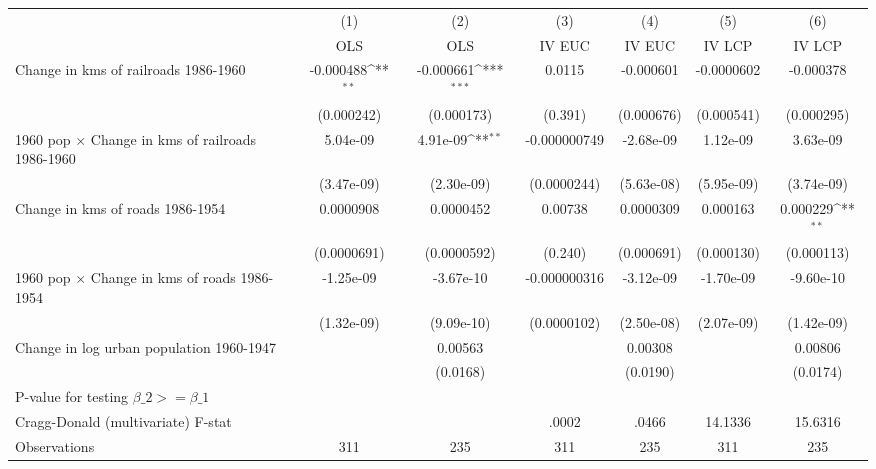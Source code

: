 {
\def\sym#1{\ifmmode^{#1}\else\(^{#1}\)\fi}
\begin{tabular}{l*{6}{c}}
\hline\hline
                &\multicolumn{1}{c}{(1)}&\multicolumn{1}{c}{(2)}&\multicolumn{1}{c}{(3)}&\multicolumn{1}{c}{(4)}&\multicolumn{1}{c}{(5)}&\multicolumn{1}{c}{(6)}\\
                &\multicolumn{1}{c}{OLS}&\multicolumn{1}{c}{OLS}&\multicolumn{1}{c}{IV EUC}&\multicolumn{1}{c}{IV EUC}&\multicolumn{1}{c}{IV LCP}&\multicolumn{1}{c}{IV LCP}\\
\hline
Change in kms of railroads 1986-1960&-0.000488\sym{**} &-0.000661\sym{***}&   0.0115         &-0.000601         &-0.0000602         &-0.000378         \\
                &(0.000242)         &(0.000173)         &  (0.391)         &(0.000676)         &(0.000541)         &(0.000295)         \\
[1em]
1960 pop $\times$ Change in kms of railroads 1986-1960& 5.04e-09         & 4.91e-09\sym{**} &-0.000000749         &-2.68e-09         & 1.12e-09         & 3.63e-09         \\
                &(3.47e-09)         &(2.30e-09)         &(0.0000244)         &(5.63e-08)         &(5.95e-09)         &(3.74e-09)         \\
[1em]
Change in kms of roads 1986-1954&0.0000908         &0.0000452         &  0.00738         &0.0000309         & 0.000163         & 0.000229\sym{**} \\
                &(0.0000691)         &(0.0000592)         &  (0.240)         &(0.000691)         &(0.000130)         &(0.000113)         \\
[1em]
1960 pop $\times$ Change in kms of roads 1986-1954&-1.25e-09         &-3.67e-10         &-0.000000316         &-3.12e-09         &-1.70e-09         &-9.60e-10         \\
                &(1.32e-09)         &(9.09e-10)         &(0.0000102)         &(2.50e-08)         &(2.07e-09)         &(1.42e-09)         \\
[1em]
Change in log urban population 1960-1947&                  &  0.00563         &                  &  0.00308         &                  &  0.00806         \\
                &                  & (0.0168)         &                  & (0.0190)         &                  & (0.0174)         \\
\hline
P-value for testing $\beta\_{2} >= \beta\_{1}$&                  &                  &                  &                  &                  &                  \\
Cragg-Donald (multivariate) F-stat&                  &                  &    .0002         &    .0466         &  14.1336         &  15.6316         \\
Observations    &      311         &      235         &      311         &      235         &      311         &      235         \\
\hline\hline
\end{tabular}
}

